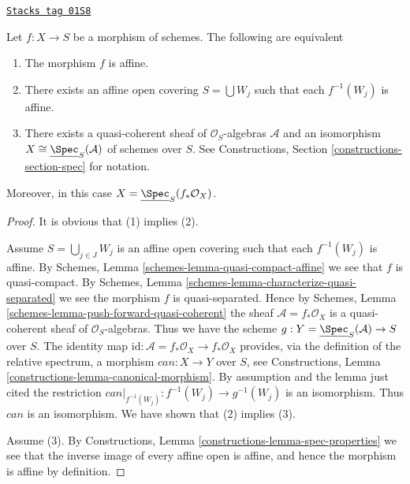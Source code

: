 \begin{lemma}
\label{morphisms-lemma-characterize-affine}
\href{https://stacks.math.columbia.edu/tag/01S8}{\texttt{Stacks tag 01S8}}

\begin{reference}
\cite[II, Corollary 1.3.2]{EGA}
\end{reference}
Let $f : X \to S$ be a morphism of schemes.
The following are equivalent
\begin{enumerate}
\item The morphism $f$ is affine.
\item There exists an affine open covering $S = \bigcup W_j$
such that each $f^{-1}(W_j)$ is affine.
\item There exists a quasi-coherent sheaf of $\mathcal{O}_S$-algebras
$\mathcal{A}$ and an isomorphism
$X \cong \underline{\Spec}_S(\mathcal{A})$
of schemes over $S$. See
Constructions, Section \ref{constructions-section-spec} for notation.
\end{enumerate}
Moreover, in this case $X = \underline{\Spec}_S(f_*\mathcal{O}_X)$.
\end{lemma}

\begin{proof}
It is obvious that (1) implies (2).

\medskip\noindent
Assume $S = \bigcup_{j \in J} W_j$ is an affine open covering such that
each $f^{-1}(W_j)$ is affine. By
Schemes, Lemma \ref{schemes-lemma-quasi-compact-affine} we see
that $f$ is quasi-compact. By
Schemes, Lemma \ref{schemes-lemma-characterize-quasi-separated}
we see the morphism $f$ is quasi-separated. Hence by
Schemes, Lemma \ref{schemes-lemma-push-forward-quasi-coherent} the
sheaf $\mathcal{A} = f_*\mathcal{O}_X$ is a quasi-coherent sheaf
of $\mathcal{O}_S$-algebras. Thus we have the scheme
$g : Y = \underline{\Spec}_S(\mathcal{A}) \to S$ over $S$.
The identity map
$\text{id} : \mathcal{A} = f_*\mathcal{O}_X \to f_*\mathcal{O}_X$
provides, via the definition of the relative spectrum,
a morphism $can : X \to Y$ over $S$, see
Constructions, Lemma \ref{constructions-lemma-canonical-morphism}.
By assumption and the lemma just cited
the restriction $can|_{f^{-1}(W_j)} : f^{-1}(W_j) \to g^{-1}(W_j)$
is an isomorphism. Thus $can$ is an isomorphism.
We have shown that (2) implies (3).

\medskip\noindent
Assume (3). By Constructions, Lemma \ref{constructions-lemma-spec-properties}
we see that the inverse image of every affine open is affine, and hence
the morphism is affine by definition.
\end{proof}

